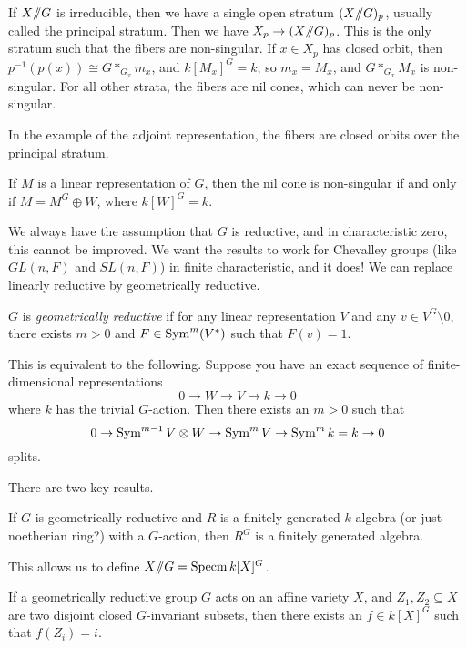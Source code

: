 \begin{remark}
 If $X\mbox{\rm /\!\!/} G$ is irreducible, then we have a single open stratum $(X\mbox{\rm /\!\!/} G)_p$, usually called the principal stratum. Then we have $X_p\to (X\mbox{\rm /\!\!/} G)_p$. This is the only stratum such that the fibers are non-singular. If $x\in X_p$ has closed orbit, then $p^{-1}(p(x))\cong G*_{G_x}m_x$, and $k[M_x]^G=k$, so $m_x=M_x$, and $G*_{G_x}M_x$ is non-singular. For all other strata, the fibers are nil cones, which can never be non-singular.
 
 In the example of the adjoint representation, the fibers are closed orbits over the principal stratum.
\end{remark}
\begin{exercise}
 If $M$ is a linear representation of $G$, then the nil cone is non-singular if and only if $M=M^G\oplus W$, where $k[W]^G=k$.
\end{exercise}

\bigskip

We always have the assumption that $G$ is reductive, and in characteristic zero, this cannot be improved. We want the results to work for Chevalley groups (like $GL(n,F)$ and $SL(n,F)$) in finite characteristic, and it does! We can replace linearly reductive by geometrically reductive.
\begin{definition}
 $G$ is \emph{geometrically reductive} if for any linear representation $V$ and any $v\in V^G\setminus 0$, there exists $m>0$ and $F\in \operatorname{Sym}^m(V^*)$ such that $F(v)=1$.
\end{definition}
This is equivalent to the following. Suppose you have an exact sequence of finite-dimensional representations
\[
 0\to W\to V\to k\to 0
\]
where $k$ has the trivial $G$-action. Then there exists an $m>0$ such that
\[
 0\to \operatorname{Sym}^{m-1} V\otimes W\to \operatorname{Sym}^m V\to \operatorname{Sym}^m k=k\to 0
\]
splits. 

There are two key results.
\begin{theorem}[Nagata?]
 If $G$ is geometrically reductive and $R$ is a finitely generated $k$-algebra (or just noetherian ring?) with a $G$-action, then $R^G$ is a finitely generated algebra.
\end{theorem}
This allows us to define $X\mbox{\rm /\!\!/} G=\operatorname{Specm} k[X]^G$.
\begin{theorem}
 If a geometrically reductive group $G$ acts on an affine variety $X$, and $Z_1, Z_2\subseteq X$ are two disjoint closed $G$-invariant subsets, then there exists an $f\in k[X]^G$ such that $f(Z_i)=i$.
\end{theorem}


